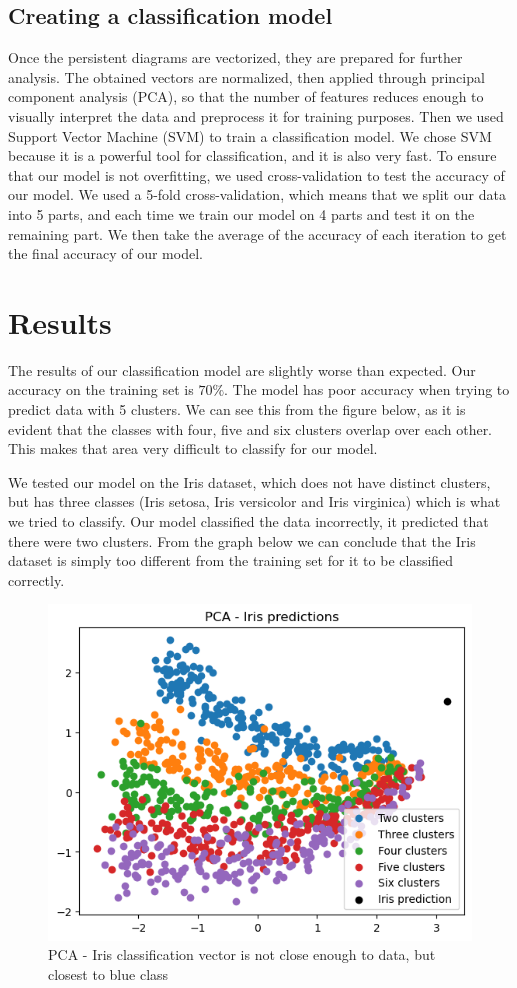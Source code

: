 \documentclass{article}
\begin{document}
\subsection{Creating a classification model}
Once the persistent diagrams are vectorized, they are prepared for further analysis. The obtained vectors are normalized, then applied through principal component analysis (PCA), so that the number of features reduces enough to visually interpret the data and preprocess it for training purposes. Then we used Support Vector Machine (SVM) to train a classification model. We chose SVM because it is a powerful tool for classification, and it is also very fast. To ensure that our model is not overfitting, we used cross-validation to test the accuracy of our model. We used a 5-fold cross-validation, which means that we split our data into 5 parts, and each time we train our model on 4 parts and test it on the remaining part. We then take the average of the accuracy of each iteration to get the final accuracy of our model.



\section{Results}
The results of our classification model are slightly worse than expected. Our accuracy on the training set is $70\%$. The model has poor accuracy when trying to predict data with 5 clusters. We can see this from the figure below, as it is evident that the classes with four, five and six clusters overlap over each other. This makes that area very difficult to classify for our model.

We tested our model on the Iris dataset, which does not have distinct clusters, but has three classes (Iris setosa, Iris versicolor and Iris virginica) which is what we tried to classify. Our model classified the data incorrectly, it predicted that there were two clusters. From the graph below we can conclude that the Iris dataset is simply too different from the training set for it to be classified correctly.

\begin{figure}[H]
    \centering
    \includegraphics[width=0.5\linewidth]{PCAIris.png}
    \caption{PCA - Iris classification vector is not close enough to data, but closest to blue class}
\end{figure}
\end{document}
